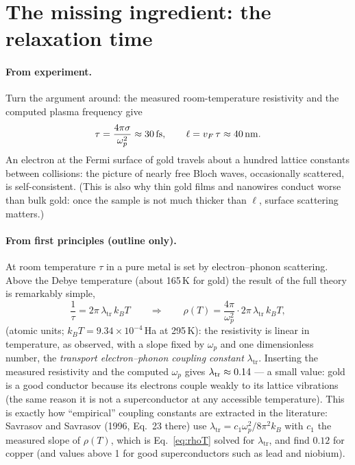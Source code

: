 \section{The missing ingredient: the relaxation time}
\label{sec:tau}

\paragraph{From experiment.} Turn the argument around: the measured
room-temperature resistivity and the computed plasma frequency give
\begin{equation}
\tau = \frac{4\pi\sigma}{\omega_p^2} \approx 30\,\mathrm{fs},
\qquad
\ell = v_F\,\tau \approx 40\,\mathrm{nm} .
\end{equation}
An electron at the Fermi surface of gold travels about a hundred lattice
constants between collisions: the picture of nearly free Bloch waves,
occasionally scattered, is self-consistent. (This is also why thin gold
films and nanowires conduct worse than bulk gold: once the sample is not
much thicker than $\ell$, surface scattering matters.)

\paragraph{From first principles (outline only).} At room temperature
$\tau$ in a pure metal is set by electron--phonon scattering. Above the
Debye temperature (about 165\,K for gold) the result of the full theory is
remarkably simple,
\begin{equation}
\frac{1}{\tau} = 2\pi\,\lambda_{\mathrm{tr}}\,k_BT
\qquad\Longrightarrow\qquad
\rho(T) = \frac{4\pi}{\omega_p^2}\cdot 2\pi\,\lambda_{\mathrm{tr}}\,k_BT ,
\label{eq:rhoT}
\end{equation}
(atomic units; $k_BT = 9.34\times10^{-4}$\,Ha at 295\,K): the resistivity
is linear in temperature, as observed, with a slope fixed by $\omega_p$
and one dimensionless number, the \emph{transport electron--phonon
coupling constant} $\lambda_{\mathrm{tr}}$. Inserting the measured
resistivity and the computed $\omega_p$ gives
$\lambda_{\mathrm{tr}}\approx0.14$ --- a small value: gold is a good
conductor because its electrons couple weakly to its lattice vibrations
(the same reason it is not a superconductor at any accessible
temperature). This is exactly how ``empirical'' coupling constants are
extracted in the literature: Savrasov and Savrasov (1996, Eq.~23 there)
use $\lambda_{\mathrm{tr}} = c_1\omega_p^2/8\pi^2k_B$ with $c_1$ the
measured slope of $\rho(T)$, which is Eq.~\eqref{eq:rhoT} solved for
$\lambda_{\mathrm{tr}}$, and find $0.12$ for copper (and values above 1
for good superconductors such as lead and niobium).

